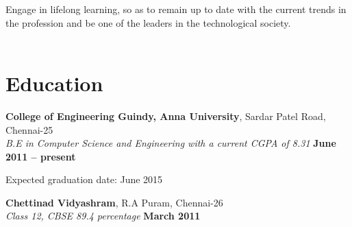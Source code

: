 \documentclass[margin,line]{resume}
\begin{document}
\begin{resume}
Engage in lifelong learning, so as to remain up to date with the current trends in the profession and be one of the leaders in the technological society. 
    \\\\\section{\mysidestyle Education}

    \textbf{College of Engineering Guindy, Anna University}, Sardar Patel Road, Chennai-25 \vspace{2mm}\\\vspace{1mm}%
    \textsl{B.E in Computer Science and Engineering with a current CGPA of 8.31} \hfill \textbf{June 2011 -- present}\vspace{-3mm}\vspace{-1mm}%
        \item Expected graduation date: June 2015
    
    \textbf{Chettinad Vidyashram}, R.A Puram, Chennai-26 \vspace{2mm}\\\vspace{1mm}%
    \textsl{Class 12, CBSE 89.4 percentage} \hfill \textbf{March 2011}\vspace{-3mm}\vspace{-1mm}%


\end{resume}
\end{document}
